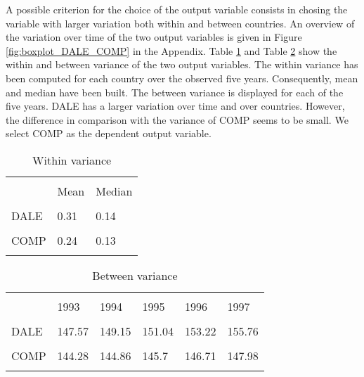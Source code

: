 \documentclass[12pt,a4paper]{article}\usepackage[]{graphicx}\usepackage[]{color}
\begin{document}
A possible criterion for the choice of the output variable consists in chosing the variable with larger variation both within and between countries. An overview of the variation over time of the two output variables is given in Figure \ref{fig:boxplot_DALE_COMP} in the Appendix. Table \ref{Within variance of DALE and COMP} and Table \ref{Between variance of DALE and COMP} show the within and between variance of the two output variables. The within variance has been computed for each country over the observed five years. Consequently, mean and median have been built. The between variance is displayed for each of the five years. DALE has a larger variation over time and over countries. However, the difference in comparison with the variance of COMP seems to be small. We select COMP as the dependent output variable.



\begin{table}[htbp] \centering 
  \caption{Within variance} 
  \label{Within variance of DALE and COMP} 
  \normalsize
\begin{tabular}{p{5cm} p{1.5cm} p{1.5cm}} 
\\[-1.8ex]\hline 
\hline \\[-1.8ex] 
 & Mean & Median \\ 
\hline \\[-1.8ex] 
DALE & 0.31 & 0.14 \\
\hline \\[-1.8ex] 
COMP & 0.24 & 0.13 \\
\hline
\hline \\[-1.8ex] 
\end{tabular} 
\end{table} 

\begin{table}[htbp] \centering 
  \caption{Between variance} 
  \label{Between variance of DALE and COMP} 
  \normalsize
\begin{tabular}{p{5cm} p{1.2cm} p{1.2cm} p{1.2cm} p{1.2cm} p{1.2cm}} 
\\[-1.8ex]\hline 
\hline \\[-1.8ex] 
 & 1993 & 1994 & 1995 & 1996 & 1997 \\ 
\hline \\[-1.8ex] 
DALE & 147.57 & 149.15 & 151.04 & 153.22 & 155.76 \\
\hline \\[-1.8ex] 
COMP & 144.28 & 144.86 & 145.7 & 146.71 & 147.98 \\
\hline
\hline \\[-1.8ex] 
\end{tabular} 
\end{table}
\end{document}
